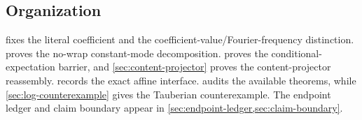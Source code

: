 \subsection{Organization}

 fixes the literal coefficient and the
coefficient-value/Fourier-frequency distinction.
 proves the no-wrap constant-mode
decomposition.   proves the
conditional-expectation barrier, and
\cref{sec:content-projector} proves the content-projector
reassembly.   records the exact affine
interface.   audits the available
theorems, while \cref{sec:log-counterexample} gives the Tauberian
counterexample.  The endpoint ledger and claim boundary appear in
\cref{sec:endpoint-ledger,sec:claim-boundary}.
